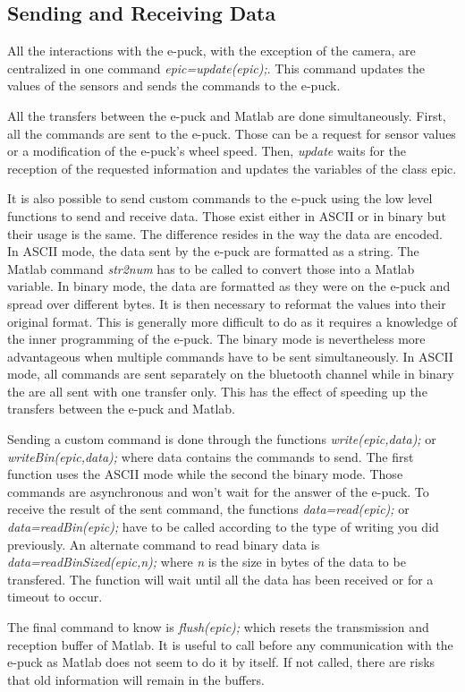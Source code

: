 \documentclass[11pt,oneside,english,a4paper]{article}
\begin{document}
\subsection{Sending and Receiving Data}
All the interactions with the e-puck, with the exception of the camera, are centralized in one command \emph{epic=update(epic);}. This command updates the values of the sensors and sends the commands to the e-puck. 
\par All the transfers between the e-puck and Matlab are done simultaneously. First, all the commands are sent to the e-puck. Those can be a request for sensor values or a modification of the e-puck's wheel speed. Then, \emph{update} waits for the reception of the requested information and updates the variables of the class epic.
\par It is also possible to send custom commands to the e-puck using the low level functions to send and receive data. Those exist either in ASCII or in binary but their usage is the same. The difference resides in the way the data are encoded. In ASCII mode, the data sent by the e-puck are formatted as a string. The Matlab command \emph{str2num} has to be called to convert those into a Matlab variable. In binary mode, the data are formatted as they were on the e-puck and spread over different bytes. It is then necessary to reformat the values into their original format. This is generally more difficult to do as it requires a knowledge of the inner programming of the e-puck. The binary mode is nevertheless more advantageous when multiple commands have to be sent simultaneously. In ASCII mode, all commands are sent separately on the bluetooth channel while in binary the are all sent with one transfer only. This has the effect of speeding up the transfers between the e-puck and Matlab.
\par Sending a custom command is done through the functions \emph{write(epic,data);} or \newline \emph{writeBin(epic,data);} where data contains the commands to send. The first function uses the ASCII mode while the second the binary mode. Those commands are asynchronous and won't wait for the answer of the e-puck. To receive the result of the sent command, the functions \emph{data=read(epic);} or \emph{data=readBin(epic);} have to be called according to the type of writing you did previously. An alternate command to read binary data is \emph{data=readBinSized(epic,n);} where \emph{n} is the size in bytes of the data to be transfered. The function will wait until all the data has been received or for a timeout to occur.
\par The final command to know is \emph{flush(epic);} which resets the transmission and reception buffer of Matlab. It is useful to call before any communication with the e-puck as Matlab does not seem to do it by itself. If not called, there are risks that old information will remain in the buffers.
\end{document}
